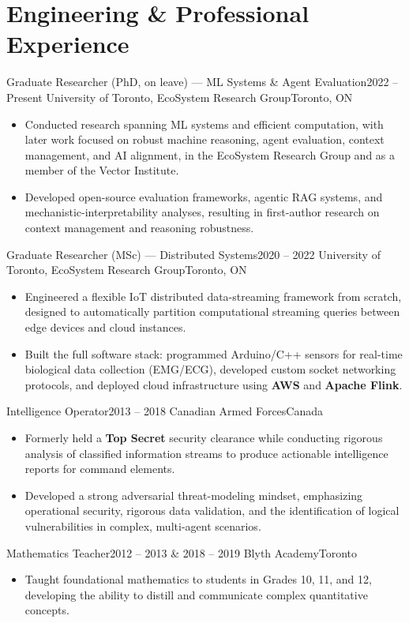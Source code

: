 \documentclass[9pt, letterpaper]{extarticle}
\newcommand{\resumeItem}[1]{\item\small{#1}}
\begin{document}
\section{Engineering \& Professional Experience}
\begin{itemize}[leftmargin=0.15in]

  \resumeSubheading
    {Graduate Researcher (PhD, on leave) --- ML Systems \& Agent Evaluation}{2022 -- Present}
    {University of Toronto, EcoSystem Research Group}{Toronto, ON}
    \begin{itemize}[leftmargin=0.15in, topsep=2pt]
        \resumeItem{Conducted research spanning ML systems and efficient computation, with later work focused on robust machine reasoning, agent evaluation, context management, and AI alignment, in the EcoSystem Research Group and as a member of the Vector Institute.}
        \resumeItem{Developed open-source evaluation frameworks, agentic RAG systems, and mechanistic-interpretability analyses, resulting in first-author research on context management and reasoning robustness.}
    \end{itemize}

  \resumeSubheading
    {Graduate Researcher (MSc) --- Distributed Systems}{2020 -- 2022}
    {University of Toronto, EcoSystem Research Group}{Toronto, ON}
    \begin{itemize}[leftmargin=0.15in, topsep=2pt]
        \resumeItem{Engineered a flexible IoT distributed data-streaming framework from scratch, designed to automatically partition computational streaming queries between edge devices and cloud instances.}
        \resumeItem{Built the full software stack: programmed Arduino/C++ sensors for real-time biological data collection (EMG/ECG), developed custom socket networking protocols, and deployed cloud infrastructure using \textbf{AWS} and \textbf{Apache Flink}.}
    \end{itemize}

  \resumeSubheading
    {Intelligence Operator}{2013 -- 2018}
    {Canadian Armed Forces}{Canada}
    \begin{itemize}[leftmargin=0.15in, topsep=2pt]
        \resumeItem{Formerly held a \textbf{Top Secret} security clearance while conducting rigorous analysis of classified information streams to produce actionable intelligence reports for command elements.}
        \resumeItem{Developed a strong adversarial threat-modeling mindset, emphasizing operational security, rigorous data validation, and the identification of logical vulnerabilities in complex, multi-agent scenarios.}
    \end{itemize}

    \resumeSubheading
    {Mathematics Teacher}{2012 -- 2013 \& 2018 -- 2019}
    {Blyth Academy}{Toronto}
    \begin{itemize}[leftmargin=0.15in, topsep=2pt]
        \resumeItem{Taught foundational mathematics to students in Grades 10, 11, and 12, developing the ability to distill and communicate complex quantitative concepts.}
    \end{itemize}

\end{itemize}
\end{document}
